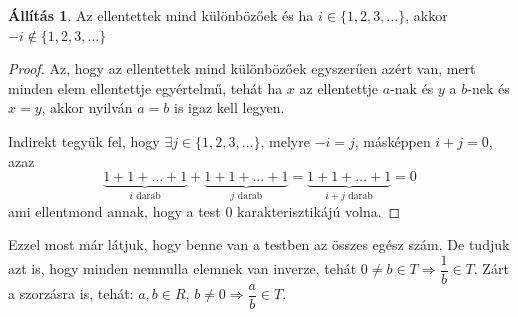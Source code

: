 \documentclass[12pt]{book}
\theoremstyle{plain} %
\theoremstyle{definition} %
\newtheorem{all/}{Állítás}[section]
\newenvironment{all}
{\renewcommand{\qedsymbol}{$\clubsuit$}%
	\pushQED{\qed}\begin{all/}}
	{\popQED\end{all/}}
\theoremstyle{remark}
\renewcommand\qedsymbol{$\blacksquare$}
\numberwithin{equation}{section}  %
\begin{document}
	\begin{all}
		Az ellentettek mind különbözőek és ha $i\in \{ 1,2,3,\ldots \}$, akkor $-i \notin \{ 1,2,3,\ldots \}$
	\end{all}
	\begin{proof}
		Az, hogy az ellentettek mind különbözőek egyszerűen azért van, mert minden elem ellentettje egyértelmű, tehát ha $x$ az ellentettje $a$-nak és $y$ a $b$-nek és $x=y$, akkor nyilván $a=b$ is igaz kell legyen.
		
		Indirekt tegyük fel, hogy $\exists j\in \{ 1,2,3,\ldots \}$, melyre $-i=j$, másképpen $i+j=0$, azaz
		\[\underbrace{1+1+\ldots+1}_{i \text{ darab}} + \underbrace{1+1+\ldots+1}_{j \text{ darab}} = \underbrace{1+1+\ldots+1}_{i+j \text{ darab}} =  0  \]
		ami ellentmond annak, hogy a test 0 karakterisztikájú volna.
	\end{proof}
	Ezzel most már látjuk, hogy benne van a testben az összes egész szám. De tudjuk azt is, hogy minden nemnulla elemnek van inverze, tehát $0\neq b\in T \Rightarrow \dfrac{1}{b}\in T$. Zárt a szorzásra is, tehát: $a,b\in R$, $b\neq 0 \Rightarrow \dfrac{a}{b}\in T$.
	
\end{document}
